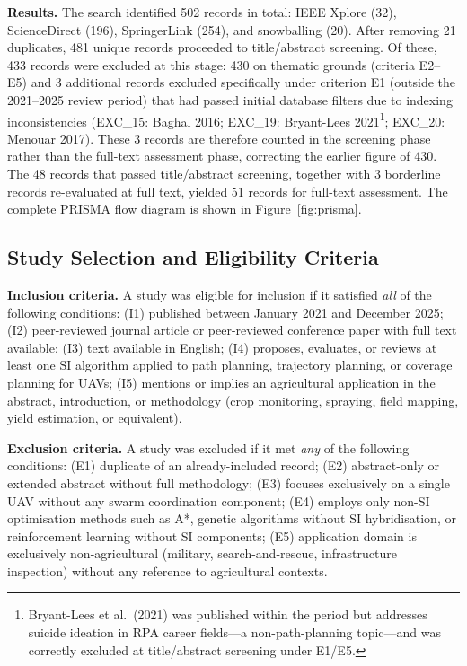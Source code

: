 \documentclass[review,3p,times]{elsarticle}
\begin{document}
\textbf{Results.} The search identified 502 records in total: IEEE Xplore (32), ScienceDirect (196), SpringerLink (254), and snowballing (20). After removing 21 duplicates, 481 unique records proceeded to title/abstract screening. Of these, 433 records were excluded at this stage: 430 on thematic grounds (criteria E2--E5) and 3 additional records excluded specifically under criterion E1 (outside the 2021--2025 review period) that had passed initial database filters due to indexing inconsistencies (EXC\_15: Baghal 2016; EXC\_19: Bryant-Lees 2021\footnote{Bryant-Lees et al.\ (2021) was published within the period but addresses suicide ideation in RPA career fields---a non-path-planning topic---and was correctly excluded at title/abstract screening under E1/E5.}; EXC\_20: Menouar 2017). These 3 records are therefore counted in the screening phase rather than the full-text assessment phase, correcting the earlier figure of 430. The 48 records that passed title/abstract screening, together with 3 borderline records re-evaluated at full text, yielded 51 records for full-text assessment. The complete PRISMA flow diagram is shown in Figure~\ref{fig:prisma}.

\subsection{Study Selection and Eligibility Criteria}

\textbf{Inclusion criteria.} A study was eligible for inclusion if it satisfied \textit{all} of the following conditions: (I1) published between January 2021 and December 2025; (I2) peer-reviewed journal article or peer-reviewed conference paper with full text available; (I3) text available in English; (I4) proposes, evaluates, or reviews at least one SI algorithm applied to path planning, trajectory planning, or coverage planning for UAVs; (I5) mentions or implies an agricultural application in the abstract, introduction, or methodology (crop monitoring, spraying, field mapping, yield estimation, or equivalent).

\textbf{Exclusion criteria.} A study was excluded if it met \textit{any} of the following conditions: (E1) duplicate of an already-included record; (E2) abstract-only or extended abstract without full methodology; (E3) focuses exclusively on a single UAV without any swarm coordination component; (E4) employs only non-SI optimisation methods such as A*, genetic algorithms without SI hybridisation, or reinforcement learning without SI components; (E5) application domain is exclusively non-agricultural (military, search-and-rescue, infrastructure inspection) without any reference to agricultural contexts.
\end{document}
